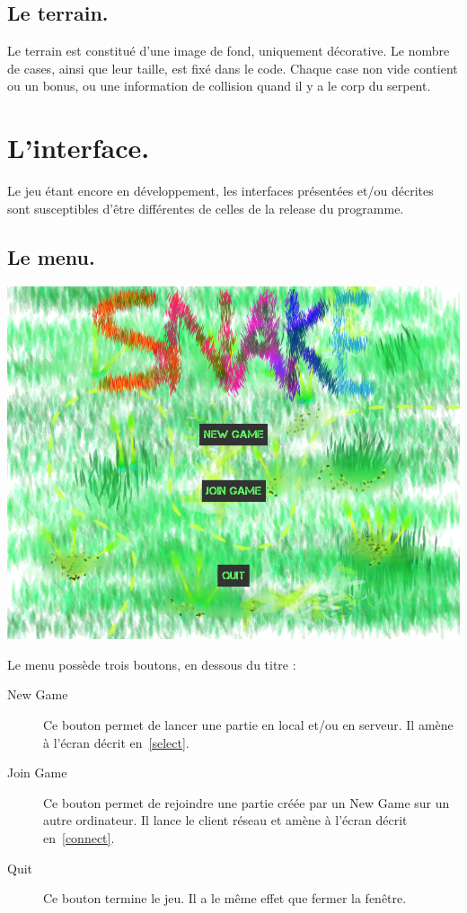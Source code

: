 \documentclass{article}
\begin{document}
\subsection{Le terrain.}
Le terrain est constitué d'une image de fond, uniquement décorative. Le nombre de cases, ainsi que leur taille, est fixé dans le code. Chaque case non vide contient ou un bonus, ou une information de collision quand il y a le corp du serpent.

\section{L'interface.}
Le jeu étant encore en développement, les interfaces présentées et/ou décrites sont susceptibles d'être différentes de celles de la release du programme.

\subsection{Le menu.} \label{menu}
\begin{center}
	\includegraphics[scale=0.4]{img/menu.png}
\end{center}
Le menu possède trois boutons, en dessous du titre :
\begin{description}
	\item[New Game] Ce bouton permet de lancer une partie en local et/ou en serveur. Il amène à l'écran décrit en~\ref{select}.
	\item[Join Game] Ce bouton permet de rejoindre une partie créée par un New Game sur un autre ordinateur. Il lance le client réseau et amène à l'écran décrit en~\ref{connect}.
	\item[Quit] Ce bouton termine le jeu. Il a le même effet que fermer la fenêtre.
\end{description}
\end{document}
